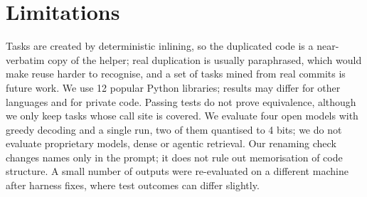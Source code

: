 \documentclass[11pt]{article}
\begin{document}
\section*{Limitations}

Tasks are created by deterministic inlining, so the duplicated code is a near-verbatim copy of the helper;
real duplication is usually paraphrased, which would make reuse harder to recognise, and a set of tasks
mined from real commits is future work. We use 12 popular Python libraries; results may differ for other
languages and for private code. Passing tests do not prove equivalence, although we only keep tasks whose
call site is covered. We evaluate four open models with greedy decoding and a single run, two of them
quantised to 4 bits; we do not evaluate proprietary models, dense or agentic retrieval. Our renaming check
changes names only in the prompt; it does not rule out memorisation of code structure. A small number of
outputs were re-evaluated on a different machine after harness fixes, where test outcomes can differ slightly.


\end{document}
